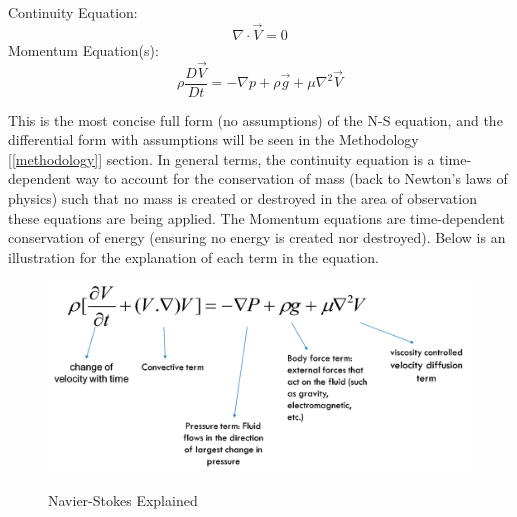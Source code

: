 \documentclass{article}
\begin{document}
\begin{boxA}
	Continuity Equation:
	\begin{equation}
		\nabla \cdot \vec{V} = 0
	\end{equation}
	Momentum Equation(s):
	\begin{equation}
		\rho \frac{D \vec{V}}{Dt} = -\nabla p + \rho \vec{g} + \mu
		\nabla^2 \vec{V}
	\end{equation}

\end{boxA}


This is the most concise full form (no assumptions) of the N-S equation,
and the differential form with assumptions will be seen in the Methodology
	[\ref{methodology}] section. In general terms, the continuity equation is a
time-dependent way to account for the conservation of mass (back to Newton's
laws of physics) such that no mass is created or destroyed in the area of
observation these equations are being applied. The Momentum equations are
time-dependent conservation of energy (ensuring no energy is created nor
destroyed). Below is an  illustration for the explanation of each term in the
equation.

\begin{figure}[htb]
	\centering
	\includegraphics[scale=0.25]{./images/f.png}\label{fig:ns_ref}
	\caption{Navier-Stokes Explained\cite{sim_world_2014} }
\end{figure}
\end{document}
